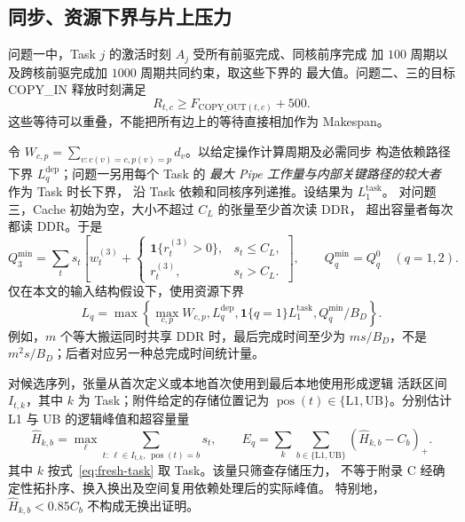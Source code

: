 \subsection{同步、资源下界与片上压力}
问题一中，Task $j$ 的激活时刻 $A_j$ 受所有前驱完成、同核前序完成
加 $100$ 周期以及跨核前驱完成加 $1000$ 周期共同约束，取这些下界的
最大值。问题二、三的目标 COPY\_IN 释放时刻满足
\begin{equation}
 R_{t,c}\ge F_{\mathrm{COPY\_OUT}(t,c)}+500.
\end{equation}
这些等待可以重叠，不能把所有边上的等待直接相加作为 Makespan。

令 $W_{c,p}=\sum_{v:c(v)=c,p(v)=p}d_v$。以给定操作计算周期及必需同步
构造依赖路径下界 $L_q^{\mathrm{dep}}$；问题一另用每个 Task 的
\emph{最大 Pipe 工作量与内部关键路径的较大者} 作为 Task 时长下界，
沿 Task 依赖和同核序列递推。设结果为 $L_1^{\mathrm{task}}$。
对问题三，Cache 初始为空，大小不超过 $C_L$ 的张量至少首次读 DDR，
超出容量者每次都读 DDR。于是
\begin{equation}
 Q_3^{\min}=\sum_t s_t\left[w_t^{(3)}+
 \begin{cases}\mathbf1\{r_t^{(3)}>0\},&s_t\le C_L,\\
 r_t^{(3)},&s_t>C_L.\end{cases}\right],\qquad
 Q_q^{\min}=Q_q^0\quad(q=1,2).
\end{equation}
仅在本文的输入结构假设下，使用资源下界
\begin{equation}
 L_q=\max\left\{\max_{c,p}W_{c,p},L_q^{\mathrm{dep}},
 \mathbf1\{q=1\}L_1^{\mathrm{task}},Q_q^{\min}/B_D\right\}.
 \label{eq:fresh-floor}
\end{equation}
例如，$m$ 个等大搬运同时共享 DDR 时，最后完成时间至少为
$ms/B_D$，不是 $m^2s/B_D$；后者对应另一种总完成时间统计量。

对候选序列，张量从首次定义或本地首次使用到最后本地使用形成逻辑
活跃区间 $I_{t,k}$，其中 $k$ 为 Task；附件给定的存储位置记为
$\operatorname{pos}(t)\in\{\mathrm{L1},\mathrm{UB}\}$。分别估计 L1 与 UB 的逻辑峰值和超容量量
\begin{equation}
 \widehat H_{k,b}=\max_\ell\sum_{t:\,\ell\in I_{t,k},\,\operatorname{pos}(t)=b}s_t,
 \qquad E_q=\sum_k\sum_{b\in\{\mathrm{L1},\mathrm{UB}\}}
       (\widehat H_{k,b}-C_b)_+.
 \label{eq:fresh-memory}
\end{equation}
其中 $k$ 按式~\eqref{eq:fresh-task} 取 Task。该量只筛查存储压力，
不等于附录 C 经确定性拓扑序、换入换出及空间复用依赖处理后的实际峰值。
特别地，$\widehat H_{k,b}<0.85C_b$ 不构成无换出证明。

